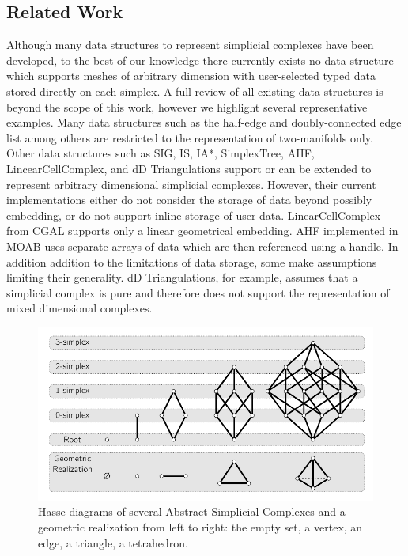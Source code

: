 \subsection{Related Work}
\par Although many data structures to represent simplicial complexes have been developed, to the best of our knowledge there currently exists no data structure which supports meshes of arbitrary dimension with user-selected typed data stored directly on each simplex.
A full review of all existing data structures is beyond the scope of this work,
however we highlight several representative examples.
Many data structures such as the half-edge and doubly-connected edge list among others are restricted to the representation of two-manifolds only\cite{DeFloriani2005}.
Other data structures such as SIG\cite{DeFloriani2004}, IS\cite{DeFloriani2010b}, IA*\cite{Canino2011}, SimplexTree\cite{Boissonnat2012}, AHF\cite{Dyedov2015,Ray2015}, LincearCellComplex, and dD Triangulations\cite{boissonnat:inria-00412437} support or can be extended to represent arbitrary dimensional simplicial complexes.
However, their current implementations either do not consider the storage of data beyond possibly embedding, or do not support inline storage of user data.
LinearCellComplex from CGAL supports only a linear geometrical embedding\cite{CGAL}.
AHF implemented in MOAB uses separate arrays of data which are then referenced using a handle\cite{Dyedov2015,Ray2015}.
In addition addition to the limitations of data storage, some make assumptions limiting their generality.
dD Triangulations, for example, assumes that a simplicial complex is pure and therefore does not support the representation of mixed dimensional complexes\cite{boissonnat:inria-00412437}.

\begin{figure}[ht!]
	\centering
	\includegraphics[width=\textwidth]{Figures/hasse/hasse}
	\caption{Hasse diagrams of several Abstract Simplicial Complexes and a geometric realization from left to right: the empty set, a vertex, an edge, a triangle, a tetrahedron.}
	\label{fig:hasse}
\end{figure}

